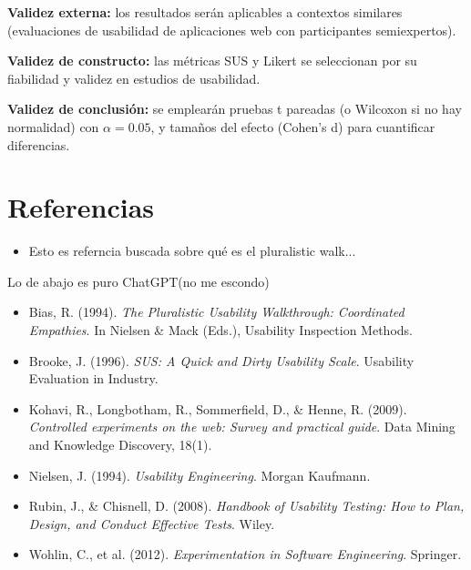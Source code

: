 \documentclass[a4paper,12pt]{report}
\begin{document}
\textbf{Validez externa:} los resultados serán aplicables a contextos similares (evaluaciones de usabilidad de aplicaciones web con participantes semiexpertos).  

\textbf{Validez de constructo:} las métricas SUS y Likert se seleccionan por su fiabilidad y validez en estudios de usabilidad.  

\textbf{Validez de conclusión:} se emplearán pruebas t pareadas (o Wilcoxon si no hay normalidad) con $\alpha=0.05$, y tamaños del efecto (Cohen’s d) para cuantificar diferencias.

\chapter*{Referencias}
\begin{itemize}
	\item Esto es referncia buscada sobre qué es el pluralistic walk...\cite{PluralisticWalkthrough}
\end{itemize}


Lo de abajo es puro ChatGPT(no me escondo)
\begin{itemize}
    \item Bias, R. (1994). \textit{The Pluralistic Usability Walkthrough: Coordinated Empathies}. In Nielsen \& Mack (Eds.), Usability Inspection Methods.
    \item Brooke, J. (1996). \textit{SUS: A Quick and Dirty Usability Scale}. Usability Evaluation in Industry.
    \item Kohavi, R., Longbotham, R., Sommerfield, D., \& Henne, R. (2009). \textit{Controlled experiments on the web: Survey and practical guide}. Data Mining and Knowledge Discovery, 18(1).
    \item Nielsen, J. (1994). \textit{Usability Engineering}. Morgan Kaufmann.
    \item Rubin, J., \& Chisnell, D. (2008). \textit{Handbook of Usability Testing: How to Plan, Design, and Conduct Effective Tests}. Wiley.
    \item Wohlin, C., et al. (2012). \textit{Experimentation in Software Engineering}. Springer.
\end{itemize}

\cleardoublepage

\printbibliography[heading=bibintoc,title={Bibliografía}]
\appendix
\end{document}
